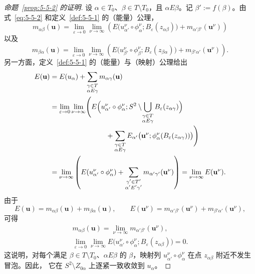 \begin{proof}[命题~\ref{prop:5-5-2} 的证明]
设 $\alpha\in T_0$、$\beta\in T\setminus T_0$，且 $\alpha E\beta$。记
$\beta':=f(\beta)$。由式~\eqref{eq:5-5-2} 和定义~\ref{def:5-5-1} 的（能量）公理，
\[
  m_{\alpha\beta}(\mathbf u)
  =\lim_{\varepsilon\to0}\lim_{\nu\to\infty}
  \left(
    E\bigl(u_{\alpha'}^\nu\circ\phi_\alpha^\nu;
      B_\varepsilon(z_{\alpha\beta})\bigr)
    +m_{\alpha'\beta'}(\mathbf u^\nu)
  \right)
\]
以及
\[
  m_{\beta\alpha}(\mathbf u)
  =\lim_{\varepsilon\to0}\lim_{\nu\to\infty}
  \left(
    E\bigl(u_{\beta'}^\nu\circ\phi_\beta^\nu;
      B_\varepsilon(z_{\beta\alpha})\bigr)
    +m_{\beta'\alpha'}(\mathbf u^\nu)
  \right).
\]
另一方面，定义~\ref{def:5-5-1} 的（能量）与（映射）公理给出
\[
  \begin{aligned}
  E(\mathbf u)
  &=E(u_\alpha)+\sum_{\substack{\gamma\in T\\\alpha E\gamma}}
    m_{\alpha\gamma}(\mathbf u)\\
  &=\lim_{\varepsilon\to0}\lim_{\nu\to\infty}
    \Biggl(
      E\Bigl(u_{\alpha'}^\nu\circ\phi_\alpha^\nu;
        S^2\setminus\!\bigcup_{\substack{\gamma\in T\\\alpha E\gamma}}
        B_\varepsilon(z_{\alpha\gamma})\Bigr)\\[-0.4ex]
  &\hspace{8em}
      +\sum_{\substack{\gamma\in T\\\alpha E\gamma}}
       E_{\alpha'}\bigl(\mathbf u^\nu;
        \phi_\alpha^\nu(B_\varepsilon(z_{\alpha\gamma}))\bigr)
    \Biggr)\\
  &=\lim_{\nu\to\infty}
    \left(
      E(u_{\alpha'}^\nu\circ\phi_\alpha^\nu)
      +\sum_{\substack{\gamma'\in T'\\\alpha'E'\gamma'}}
       m_{\alpha'\gamma'}(\mathbf u^\nu)
    \right)
   =\lim_{\nu\to\infty}E(\mathbf u^\nu).
  \end{aligned}
\]
由于
\[
  E(\mathbf u)
  =m_{\alpha\beta}(\mathbf u)+m_{\beta\alpha}(\mathbf u),
  \qquad
  E(\mathbf u^\nu)
  =m_{\alpha'\beta'}(\mathbf u^\nu)
   +m_{\beta'\alpha'}(\mathbf u^\nu),
\]
可得
\begin{equation}\label{eq:5-5-3}
  \begin{gathered}
  m_{\alpha\beta}(\mathbf u)
  =\lim_{\nu\to\infty}m_{\alpha'\beta'}(\mathbf u^\nu),\\
  \lim_{\varepsilon\to0}\lim_{\nu\to\infty}
  E\bigl(u_{\alpha'}^\nu\circ\phi_\alpha^\nu;
    B_\varepsilon(z_{\alpha\beta})\bigr)=0.
  \end{gathered}
\end{equation}
这说明，对每个满足 $\beta\in T\setminus T_0$、$\alpha E\beta$ 的 $\beta$，映射列
$u_{\alpha'}^\nu\circ\phi_\alpha^\nu$ 在点 $z_{\alpha\beta}$ 附近不发生冒泡。因此，
它在 $S^2\setminus Z_{0\alpha}$ 上逐紧一致收敛到 $u_\alpha$。


\end{proof}
